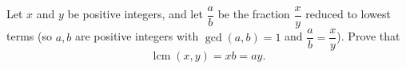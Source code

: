 Let $x$ and $y$ be positive integers, and let $\dfrac {a}{b}$ be the fraction $\dfrac {x}{y}$ reduced to lowest terms (so $a,b$ are positive integers with $\gcd(a,b)=1$ and $\dfrac {a}{b}=\dfrac {x}{y}$). Prove that
\[\operatorname{lcm}(x,y)=xb=ay .\]
